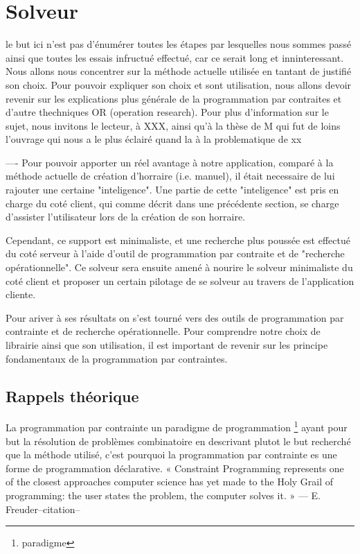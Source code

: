 \section{Solveur}
le but ici n'est pas d'énumérer toutes les étapes par lesquelles nous sommes passé ainsi que toutes les essais infructué effectué, car ce serait long et inninteressant. Nous allons nous concentrer sur la méthode actuelle utilisée en tantant de justifié son choix. Pour pouvoir expliquer son choix et sont utilisation, nous allons devoir revenir sur les explications plus générale de la programmation par contraites et d'autre thechniques OR (operation research).  Pour plus d'information sur le sujet, nous invitons le lecteur, à XXX, ainsi qu'à la thèse de M qui fut de loins l'ouvrage qui nous a le plus éclairé quand la à la problematique de xx


----
Pour pouvoir apporter un réel avantage à notre application, comparé à la méthode actuelle de création d'horraire (i.e. manuel), il était necessaire de lui rajouter une certaine "inteligence". 
Une partie de cette "inteligence" est pris en charge du coté client, qui comme décrit dans une précédente section, se charge d'assister l'utilisateur lors de la création de son horraire.

Cependant, ce support est minimaliste, et une recherche plus poussée est effectué du coté serveur à l'aide d'outil de programmation par contraite et de "recherche opérationnelle".  Ce solveur sera ensuite amené à nourire le solveur minimaliste du coté client et proposer un certain pilotage de se solveur au travers de l'application cliente. 

Pour ariver à ses résultats on s'est tourné vers des outils de programmation par contrainte et de recherche opérationnelle. 
Pour comprendre notre choix de librairie ainsi que son utilisation, il est important de revenir sur les principe fondamentaux de la programmation par contraintes.


\subsection{Rappels théorique}

La programmation par contrainte un paradigme de programmation \footnote{paradigme} ayant pour but la résolution de problèmes combinatoire en
descrivant plutot le but recherché que la méthode utilisé, c'est pourquoi la programmation par contrainte es une forme de programmation déclarative.
« Constraint Programming represents one of the closest approaches computer science has yet made to the Holy Grail of programming: the user states the problem, the computer solves it. »
— E. Freuder--citation--

